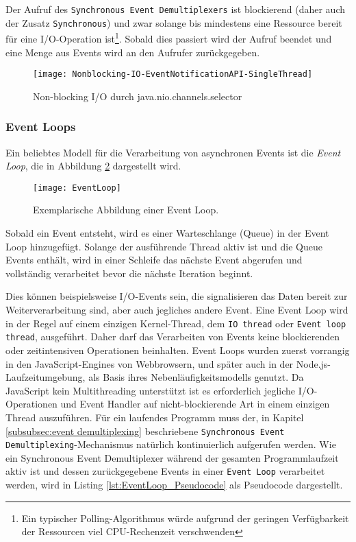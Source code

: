 Der Aufruf des \verb|Synchronous Event Demultiplexers| ist blockierend (daher auch der Zusatz \verb|Synchronous|)
und zwar solange bis mindestens eine Ressource bereit für eine I/O-Operation ist\footnote{Ein typischer Polling-Algorithmus würde aufgrund der geringen Verfügbarkeit der Ressourcen
  viel CPU-Rechenzeit verschwenden}.
Sobald dies passiert wird der Aufruf beendet und eine Menge aus Events wird an den Aufrufer zurückgegeben.
\begin{figure}[ht!]
  \centering
  \texttt{[image: Nonblocking-IO-EventNotificationAPI-SingleThread]}
  \caption{Non-blocking I/O durch java.nio.channels.selector \parencite{NettyInAction}}
  \label{fig:nonblocking_single_thread}
\end{figure}

\subsubsection{Event Loops}
\label{subsubsec:event loops}
Ein beliebtes Modell für die Verarbeitung von asynchronen Events ist die \textit{Event Loop}, die in Abbildung \ref{fig:eventloop} dargestellt wird.
\begin{figure}[ht!]
  \centering
  \texttt{[image: EventLoop]}
  \caption{Exemplarische Abbildung einer Event Loop. \parencite[Kapitel 1.7]{Ponge2020}}
  \label{fig:eventloop}
\end{figure}

Sobald ein Event entsteht, wird es einer Warteschlange (Queue) in der Event Loop hinzugefügt.
Solange der ausführende Thread aktiv ist und die Queue Events enthält, wird in einer Schleife das nächste Event
abgerufen und vollständig verarbeitet bevor die nächste Iteration beginnt.

Dies können beispielsweise I/O-Events sein, die signalisieren das Daten bereit zur Weiterverarbeitung sind,
aber auch jegliches andere Event.
Eine Event Loop wird in der Regel auf einem einzigen Kernel-Thread, dem \verb|IO thread| oder \verb|Event loop thread|,
ausgeführt. Daher darf das Verarbeiten von Events keine blockierenden oder zeitintensiven Operationen beinhalten.
Event Loops wurden zuerst vorrangig in den JavaScript-Engines von Webbrowsern,
und später auch in der Node.js-Laufzeitumgebung, als Basis ihres Nebenläufigkeitsmodells genutzt.
Da JavaScript kein Multithreading unterstützt \parencite{MozillaEventLoop} ist es erforderlich jegliche I/O-Operationen und
Event Handler auf nicht-blockierende Art in einem einzigen Thread auszuführen.\parencite{NodeJSEventLoop}
Für ein laufendes Programm muss der, in Kapitel \ref{subsubsec:event demultiplexing} beschriebene
\newline
\verb|Synchronous Event Demultiplexing|-Mechanismus natürlich kontinuierlich aufgerufen werden.
Wie ein Synchronous Event Demultiplexer während der
gesamten Programmlaufzeit aktiv ist und dessen zurückgegebene Events in einer \verb|Event Loop| verarbeitet werden,
wird in Listing \ref{lst:EventLoop_Pseudocode} als Pseudocode dargestellt.
\newline

